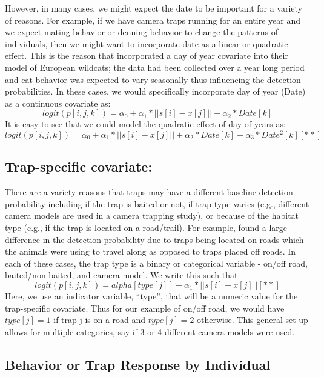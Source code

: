 However, in many cases, we might expect the date to be important for a
variety of reasons.  For example, if we have camera traps running for
an entire year and we expect mating behavior or denning behavior to
change the patterns of individuals, then we might want to incorporate
date as a linear or quadratic effect.  This is the reason that
\citet{kery_etal:2011} incorporated a day of year covariate into their
model of European wildcats; the data had been collected over a year
long period and cat behavior was expected to vary seasonally thus
influencing the detection probabilities.  In these cases, we would
specifically incorporate day of year (Date) as a continuous covariate
as:
\[
 	logit(p[i,j,k]) = \alpha_0 + \alpha_1*||s[i]-x[j]|| + \alpha_2*Date[k]  
\]
It is easy to see that we could model the quadratic effect of day of years as:
\[
           logit(p[i,j,k]) = \alpha_0 + \alpha_1*||s[i]-x[j]|| + \alpha_2*Date[k] + \alpha_3*Date^2[k]   [**]
\]


\subsection{Trap-specific covariate:}

There are a variety reasons that traps may have a different baseline
detection probability including if the trap is baited or not, if trap
type varies (e.g., different camera models are used in a camera
trapping study), or because of the habitat type (e.g., if the trap is
located on a road/trail).  For example, \citet{sollmann_etal:2011} found a large difference in the detection probability due to traps being located on roads which the animals were using to travel along as opposed to traps placed off roads.  In each of these cases, the trap type is a binary or categorical variable - on/off road, baited/non-baited, and camera model.   We write this such that:  
\[
                                  logit(p[i,j,k]) = alpha[type[j]] +
                                  \alpha_1*||s[i]-x[j]||
                                  [**]
\]
Here, we use an indicator variable, ``type'', that will be a numeric
value for the trap-specific covariate.  Thus for our example of on/off
road, we would have $type[j] = 1$ if trap j is on a road and $type[j]
= 2$ otherwise.  This general set up allows for multiple categories,
say if 3 or 4 different camera models were used.


\subsection{Behavior or Trap Response by Individual}

